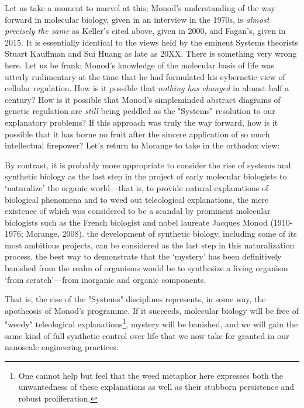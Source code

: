 Let us take a moment to marvel at this; Monod's understanding of the way forward in molecular biology, given in an interview in the 1970s, is \textit{almost precisely the same} as Keller's cited above, given in 2000, and Fagan's, given in 2015. It is essentially identical to the views held by the eminent Systems theorists Stuart Kauffman and Sui Huang as late as 20XX. There is something very wrong here. Let us be frank: Monod's knowledge of the molecular basis of life was utterly rudimentary at the time that he had formulated his cybernetic view of cellular regulation. How is it possible that \textit{nothing has changed} in almost half a century? How is it possible that Monod's simpleminded abstract diagrams of genetic regulation are \textit{still} being peddled as the "Systems" resolution to our explanatory problems? If this approach was truly the way forward, how is it possible that it has borne no fruit after the sincere application of so much intellectual firepower? Let's return to Morange to take in the orthodox view:

\begin{longquote}
By contrast, it is probably more appropriate to consider the rise of systems and
synthetic biology as the last step in the
project of early molecular biologists to
‘naturalize’ the organic world—that is, to
provide natural explanations of biological
phenomena and to weed out teleological explanations, the mere existence of
which was considered to be a scandal by
prominent molecular biologists such as
the French biologist and nobel laureate
Jacques Monod (1910-1976; Morange,
2008). the development of synthetic biology, including some of its most ambitious
projects, can be considered as the last step
in this naturalization process. the best way
to demonstrate that the ‘mystery’ has been
definitively banished from the realm of
organisms would be to synthesize a living
organism ‘from scratch’—from inorganic
and organic components.
\cite{Morange2009}
\end{longquote}

That is, the rise of the "Systems" disciplines represents, in some way, the apotheosis of Monod's programme. If it succeeds, molecular biology will be free of "weedy" teleological explanations\footnote{One cannot help but feel that the weed metaphor here expresses both the unwantedness of these explanations as well as their stubborn persistence and robust proliferation.}, mystery will be banished, and we will gain the same kind of full synthetic control over life that we now take for granted in our nanoscale engineering practices.

